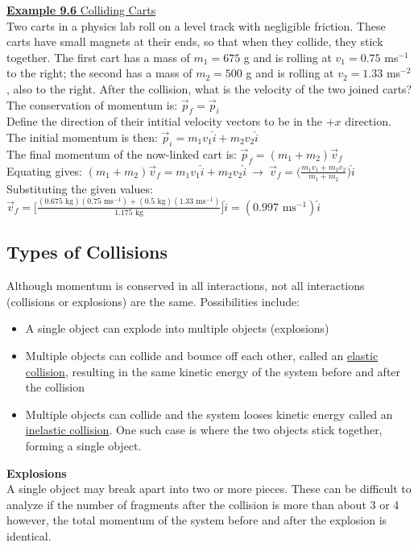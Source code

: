 \documentclass[a4paper]{article}
\let\bf\textbf
\begin{document}
\begin{shaded}
    \underline{\bf{Example 9.6} Colliding Carts}
    \vspace{2mm}\\
    Two carts in a physics lab roll on a level track with negligible friction. These carts have small magnets at their ends, so that when they collide, they stick together. The first cart has a mass of $m_1 = 675$ g and is rolling at $v_1 = 0.75$ ms$^{-1}$ to the right; the second has a mass of $m_2 = 500$ g and is rolling at $v_2 = 1.33$ ms$^{-2}$, also to the right. After the collision, what is the velocity of the two joined carts?
    \vspace{1mm}\\
    The conservation of momentum is: $\vec{p}_f = \vec{p}_i$\\
    Define the direction of their intitial velocity vectors to be in the $+x$ direction.\\
    The initial momentum is then: $\vec{p}_i = m_1v_1\hat{i} + m_2v_2\hat{i}$\\
    The final momentum of the now-linked cart is: $\vec{p}_f = (m_1 + m_2)\vec{v}_f$\\
    Equating gives: $\displaystyle (m_1 + m_2)\vec{v}_f = m_1v_1\hat{i} + m_2v_2\hat{i} \ \boldsymbol{\to} \ \vec{v}_f = \Big(\frac{m_1v_1 + m_2v_2}{m_1 + m_2}\Big)\hat{i}$\\
    Substituting the given values: $\displaystyle \vec{v}_f = \bigg[\frac{(0.675\text{ kg})(0.75\text{ ms}^{-1}) + (0.5\text{ kg})(1.33\text{ ms}^{-1})}{1.175\text{ kg}}\bigg]\hat{i} = (0.997\text{ ms}^{-1})\hat{i}$
\end{shaded}


\newpage
\subsection{Types of Collisions}
Although momentum is conserved in all interactions, not all interactions (collisions or explosions) are the same. Possibilities include:
\begin{itemize}
    \item A single object can explode into multiple objects (explosions)
    \item Multiple objects can collide and bounce off each other, called an \underline{elastic collision}, resulting in the same kinetic energy of the system before and after the collision
    \item Multiple objects can collide and the system looses kinetic energy called an \underline{inelastic collision}. One such case is where the two objects stick together, forming a single object. 
\end{itemize}
\bf{Explosions}
\vspace{1mm}\\
A single object may break apart into two or more pieces. These can be difficult to analyze if the number of fragments after the collision is more than about 3 or 4 however, the total momentum of the system before and after the explosion is identical.
\end{document}

